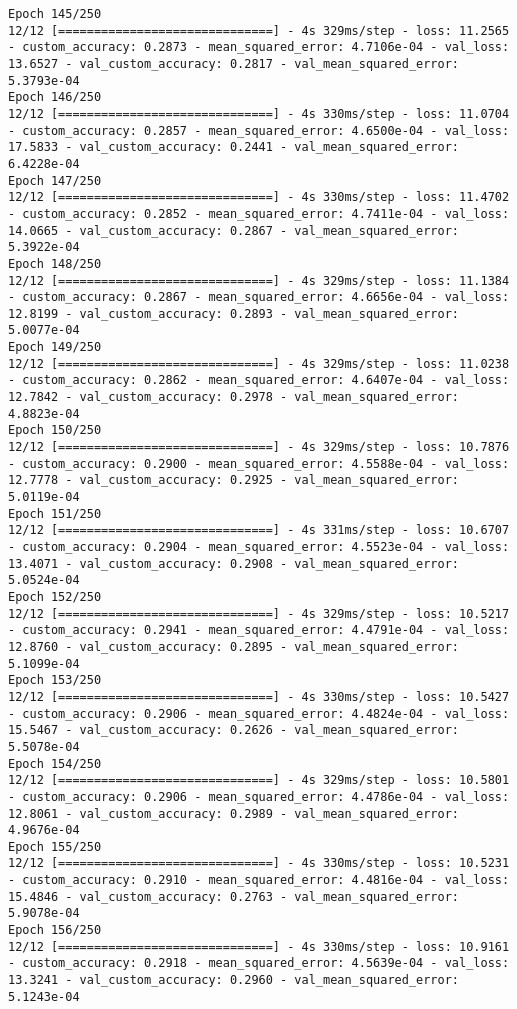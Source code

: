 \begin{lstlisting}
Epoch 145/250
12/12 [==============================] - 4s 329ms/step - loss: 11.2565 - custom_accuracy: 0.2873 - mean_squared_error: 4.7106e-04 - val_loss: 13.6527 - val_custom_accuracy: 0.2817 - val_mean_squared_error: 5.3793e-04
Epoch 146/250
12/12 [==============================] - 4s 330ms/step - loss: 11.0704 - custom_accuracy: 0.2857 - mean_squared_error: 4.6500e-04 - val_loss: 17.5833 - val_custom_accuracy: 0.2441 - val_mean_squared_error: 6.4228e-04
Epoch 147/250
12/12 [==============================] - 4s 330ms/step - loss: 11.4702 - custom_accuracy: 0.2852 - mean_squared_error: 4.7411e-04 - val_loss: 14.0665 - val_custom_accuracy: 0.2867 - val_mean_squared_error: 5.3922e-04
Epoch 148/250
12/12 [==============================] - 4s 329ms/step - loss: 11.1384 - custom_accuracy: 0.2867 - mean_squared_error: 4.6656e-04 - val_loss: 12.8199 - val_custom_accuracy: 0.2893 - val_mean_squared_error: 5.0077e-04
Epoch 149/250
12/12 [==============================] - 4s 329ms/step - loss: 11.0238 - custom_accuracy: 0.2862 - mean_squared_error: 4.6407e-04 - val_loss: 12.7842 - val_custom_accuracy: 0.2978 - val_mean_squared_error: 4.8823e-04
Epoch 150/250
12/12 [==============================] - 4s 329ms/step - loss: 10.7876 - custom_accuracy: 0.2900 - mean_squared_error: 4.5588e-04 - val_loss: 12.7778 - val_custom_accuracy: 0.2925 - val_mean_squared_error: 5.0119e-04
Epoch 151/250
12/12 [==============================] - 4s 331ms/step - loss: 10.6707 - custom_accuracy: 0.2904 - mean_squared_error: 4.5523e-04 - val_loss: 13.4071 - val_custom_accuracy: 0.2908 - val_mean_squared_error: 5.0524e-04
Epoch 152/250
12/12 [==============================] - 4s 329ms/step - loss: 10.5217 - custom_accuracy: 0.2941 - mean_squared_error: 4.4791e-04 - val_loss: 12.8760 - val_custom_accuracy: 0.2895 - val_mean_squared_error: 5.1099e-04
Epoch 153/250
12/12 [==============================] - 4s 330ms/step - loss: 10.5427 - custom_accuracy: 0.2906 - mean_squared_error: 4.4824e-04 - val_loss: 15.5467 - val_custom_accuracy: 0.2626 - val_mean_squared_error: 5.5078e-04
Epoch 154/250
12/12 [==============================] - 4s 329ms/step - loss: 10.5801 - custom_accuracy: 0.2906 - mean_squared_error: 4.4786e-04 - val_loss: 12.8061 - val_custom_accuracy: 0.2989 - val_mean_squared_error: 4.9676e-04
Epoch 155/250
12/12 [==============================] - 4s 330ms/step - loss: 10.5231 - custom_accuracy: 0.2910 - mean_squared_error: 4.4816e-04 - val_loss: 15.4846 - val_custom_accuracy: 0.2763 - val_mean_squared_error: 5.9078e-04
Epoch 156/250
12/12 [==============================] - 4s 330ms/step - loss: 10.9161 - custom_accuracy: 0.2918 - mean_squared_error: 4.5639e-04 - val_loss: 13.3241 - val_custom_accuracy: 0.2960 - val_mean_squared_error: 5.1243e-04

\end{lstlisting}
